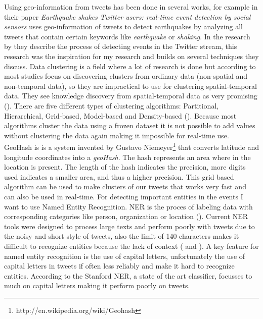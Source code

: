 \documentclass[
10pt, %
a4paper, %
oneside, %
headinclude,footinclude, %
BCOR5mm, %
]{scrartcl}
\begin{document}
\noindent Using geo-information from tweets has been done in several works, for example \citet{sakaki2010earthquake} in their paper \textit{Earthquake shakes Twitter users: real-time event detection by social sensors} uses geo-information of tweets to detect earthquakes by analyzing all tweets that contain certain keywords like \textit{earthquake} or \textit{shaking}. In the research by \citet{walther2013geo} they describe the process of detecting events in the Twitter stream, this research was the inspiration for my research and builds on several techniques they discuss. 
\vl
Data clustering is a field where a lot of research is done but according to \citet{birant2007st} most studies focus on discovering clusters from ordinary data (non-spatial and non-temporal data), so they are impractical to use for clustering spatial-temporal data. They see knowledge discovery from spatial-temporal data as very promising (\citealt{birant2007st}). There are five different types of clustering algorithms: Partitional, Hierarchical, Grid-based, Model-based and Density-based (\citealt{han2006data}). Because most algorithms cluster the data using a frozen dataset it is not possible to add values without clustering the data again making it impossible for real-time use. 
\vl
GeoHash is is a system invented by Gustavo Niemeyer\footnote{http://en.wikipedia.org/wiki/Geohash} that converts latitude and longitude coordinates into a \textit{geoHash}. The hash represents an area where in the location is present. The length of the hash indicates the precision, more digits used indicates a smaller area, and thus a higher precision. This grid based algorithm can be used to make clusters of our tweets that works very fast and can also be used in real-time.
\vl
For detecting important entities in the events I want to use Named Entity Recognition. NER is the proces of labeling data with corresponding categories like person, organization or location (\citealt{manning2008introduction}). Current NER tools were designed to process large texts and perform poorly with tweets due to the noisy and short style of tweets, also the limit of 140 characters makes it difficult to recognize entities because the lack of context (\citealt{ner2011} and \citealt{liu2011ner}). A key feature for named entity recognition is the use of capital letters, unfortunately the use of capital letters in tweets if often less reliably and make it hard to recognize entities. According to \citet{ner2011} the Stanford NER, a state of the art classifier, focusses to much on capital letters making it perform poorly on tweets.
\end{document}
